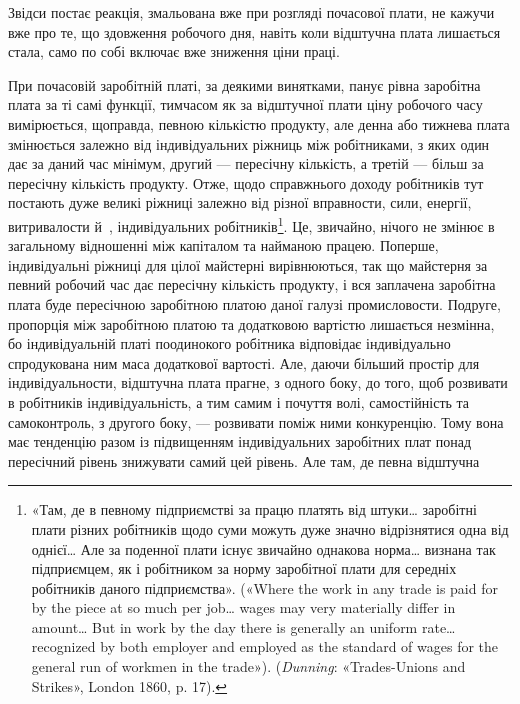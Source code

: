 \parcont{}  %
Звідси постає реакція, змальована вже при розгляді почасової
плати, не кажучи вже про те, що здовження робочого дня, навіть
коли відштучна плата лишається стала, само по собі включає
вже зниження ціни праці.

При почасовій заробітній платі, за деякими винятками, панує
рівна заробітна плата за ті самі функції, тимчасом як за відштучної
плати ціну робочого часу вимірюється, щоправда, певною
кількістю продукту, але денна або тижнева плата змінюється
залежно від індивідуальних ріжниць між робітниками, з яких
один дає за даний час мінімум, другий — пересічну кількість,
а третій — більш за пересічну кількість продукту. Отже, щодо
справжнього доходу робітників тут постають дуже великі ріжниці
залежно від різної вправности, сили, енергії, витривалости
й~, індивідуальних робітників\footnote{
«Там, де в певному підприємстві за працю платять від штуки\dots{}
заробітні плати різних робітників щодо суми можуть дуже значно відрізнятися
одна від однієї\dots{} Але за поденної плати існує звичайно однакова
норма\dots{} визнана так підприємцем, як і робітником за норму заробітної
плати для середніх робітників даного підприємства». («Where the
work in any trade is paid for by the piece at so much per job\dots{} wages may
very materially differ in amount\dots{} But in work by the day there is generally
an uniform rate\dots{} recognized by both employer and employed as the
standard of wages for the general run of workmen in the trade»). (\emph{Dunning}:
«Trades-Unions and Strikes», London 1860, p. 17).
}. Це, звичайно, нічого не
змінює в загальному відношенні між капіталом та найманою
працею. Поперше, індивідуальні ріжниці для цілої майстерні
вирівнюються, так що майстерня за певний робочий час дає пересічну
кількість продукту, і вся заплачена заробітна плата буде
пересічною заробітною платою даної галузі промисловости. Подруге,
пропорція між заробітною платою та додатковою вартістю
лишається незмінна, бо індивідуальній платі поодинокого робітника
відповідає індивідуально спродукована ним маса додаткової
вартості. Але, даючи більший простір для індивідуальности,
відштучна плата прагне, з одного боку, до того, щоб розвивати в
робітників індивідуальність, а тим самим і почуття волі, самостійність
та самоконтроль, з другого боку, — розвивати поміж
ними конкуренцію. Тому вона має тенденцію разом із підвищенням
індивідуальних заробітних плат понад пересічний рівень
знижувати самий цей рівень. Але там, де певна відштучна
